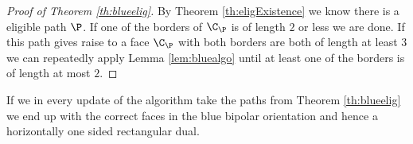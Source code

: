 \begin{proof}[Proof of Theorem \ref{th:blueelig}]
By Theorem \ref{th:eligExistence} we know there is a eligible path $\P$. If one of the borders of $\C_\P$ is of length $2$ or less we are done. If this path gives raise to a face $\C_\P$ with both borders are both of length at least $3$ we can repeatedly apply Lemma \ref{lem:bluealgo} until at least one of the borders is of length at most $2$.
\end{proof}

If we in every update of the algorithm take the paths from Theorem  \ref{th:blueelig} we end up with the correct faces in the blue bipolar orientation and hence a horizontally one sided rectangular dual.
